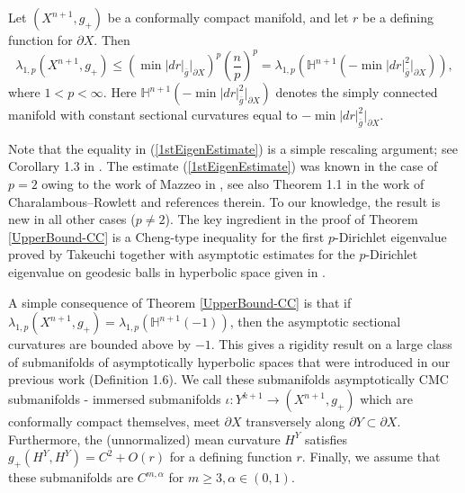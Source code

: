 \documentclass{amsart}
\newcommand{\Hyp}{\mathbb{H}^{n+1}(-1)}
\begin{document}
\begin{theorem}\label{UpperBound-CC}
    Let $(X^{n+1},g_+)$ be a conformally compact manifold, and let $r$ be a defining function for $\partial X$. Then 
    \begin{equation}\label{1stEigenEstimate}
        \lambda_{1,p}(X^{n+1},g_+) \le \left(\min|dr|_{\bar g}|_{\partial X}\right)^p\left(\frac{n}{p}\right)^{p} = \lambda_{1,p}(\mathbb{H}^{n+1}(-\min|dr|^2_{\bar g}|_{\partial X})),
    \end{equation}
    where $1<p<\infty$. Here $\mathbb{H}^{n+1}(-\min|dr|^2_{\bar g}|_{\partial X})$ denotes the simply connected manifold with constant sectional curvatures equal to $-\min|dr|^2_{\bar g}|_{\partial X}$. 
\end{theorem}

Note that the equality in (\ref{1stEigenEstimate}) is a simple rescaling argument; see Corollary 1.3 in \cite{PerezAyalaTyrrell}. The estimate (\ref{1stEigenEstimate}) was known in the case of $p=2$ owing to the work of Mazzeo in \cite{MazzeoRafe1991UCaI}, see also Theorem 1.1 in the work of Charalambous--Rowlett \cite{CharalambousNelia2024TLso} and references therein. To our knowledge, the result is new in all other cases ($p\not = 2$). The key ingredient in the proof of Theorem \ref{UpperBound-CC} is a Cheng-type inequality for the first $p$-Dirichlet eigenvalue proved by Takeuchi \cite{Takeuchi} together with asymptotic estimates for the $p$-Dirichlet eigenvalue on geodesic balls in hyperbolic space given in \cite{jin2024lowerbounddirichleteigenvalue}.

A simple consequence of Theorem \ref{UpperBound-CC} is that if $\lambda_{1,p}(X^{n+1},g_+) = \lambda_{1,p}(\Hyp)$, then the asymptotic sectional curvatures are bounded above by $-1$. This gives a rigidity result on a large class of submanifolds of asymptotically hyperbolic spaces that were introduced in our previous work \cite{PerezAyalaTyrrell} (Definition 1.6). We call these submanifolds asymptotically CMC  submanifolds - immersed submanifolds $\iota: Y^{k+1}\to (X^{n+1},g_+)$ which are conformally compact themselves, meet $\partial X$ transversely along  $\partial Y\subset \partial X$. Furthermore, the (unnormalized) mean curvature $H^Y$ satisfies $g_+(H^Y,H^Y) = C^2+O(r)$ for a defining function $r$. Finally, we assume that these submanifolds are $C^{m,\alpha}$ for $m\geq 3, \alpha\in (0,1).$
\end{document}

